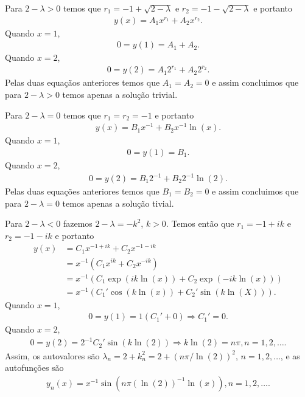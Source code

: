\documentclass[a4paper,12pt, leqno, answers]{exam}
\begin{document}
\begin{questions}
\begin{solution}
        Para $2 - \lambda > 0$ temos que $r_1 = - 1 + \sqrt{2 - \lambda}$ e $r_2 = -1 - \sqrt{2 - \lambda}$ e portanto
        \begin{align*}
            y(x) = A_1 x^{r_1} + A_2 x^{r_2}.
        \end{align*}
        Quando $x = 1$,
        \begin{align*}
            0 = y(1) = A_1 + A_2.
        \end{align*}
        Quando $x = 2$,
        \begin{align*}
            0 = y(2) = A_1 2^{r_1} + A_2 2^{r_2}.
        \end{align*}
        Pelas duas equa\c{c}\~{a}os anteriores temos que $A_1 = A_2 = 0$ e assim concluimos que para $2 - \lambda > 0$ temos apenas a solu\c{c}\~{a}o trivial.

        Para $2 - \lambda = 0$ temos que $r_1 = r_2 = -1$ e portanto
        \begin{align*}
            y(x) = B_1 x^{-1} + B_2 x^{-1} \ln(x).
        \end{align*}
        Quando $x = 1$,
        \begin{align*}
            0 = y(1) = B_1.
        \end{align*}
        Quando $x = 2$,
        \begin{align*}
            0 = y(2) = B_1 2^{-1} + B_2 2^{-1} \ln(2).
        \end{align*}
        Pelas duas equa\c{c}\~{o}es anteriores temos que $B_1 = B_2 = 0$ e assim concluimos que para $2 - \lambda = 0$ temos apenas a solu\c{c}\~{a}o tivial.

        Para $2 - \lambda < 0$ fazemos $2 - \lambda = - k^2$, $k > 0$. Temos ent\~{a}o que $r_1 = -1 + i k$ e $r_2 = -1 - i k$ e portanto
        \begin{align*}
            y(x) &= C_1 x^{-1 + i k} + C_2 x^{-1 - i k} \\
            &= x^{-1} \left( C_1 x^{i k} + C_2 x^{-i k} \right) \\
            &= x^{-1} \left( C_1 \exp(i k \ln(x)) + C_2 \exp(-i k \ln(x)) \right) \\
            &= x^{-1} \left( C_1' \cos(k \ln(x)) + C_2' \sin(k \ln(X)) \right).
        \end{align*}
        Quando $x = 1$,
        \begin{align*}
            0 = y(1) = 1 \left( C_1' + 0 \right) \Rightarrow C_1' = 0.
        \end{align*}
        Quando $x = 2$,
        \begin{align*}
            0 = y(2) = 2^{-1} C_2' \sin(k \ln(2)) \Rightarrow k \ln(2) = n \pi, n = 1, 2, \ldots.
        \end{align*}
        Assim, os autovalores s\~{a}o $\lambda_n = 2 + k_n^2 = 2 + (n \pi / \ln(2))^2$, $n = 1, 2, \ldots$, e as autofun\c{c}\~{o}es s\~{a}o
        \begin{align*}
            y_n(x) = x^{-1} \sin \left( n \pi (\ln(2))^{-1} \ln(x) \right), n = 1, 2, \ldots.
        \end{align*}
    \end{solution}


\end{questions}
\end{document}
